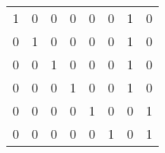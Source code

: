 
\begin{table}[h]
\centering
\begin{tabular}{cccccccc}
1 & 0 & 0 & 0 & 0 & 0 & 1 & 0\\
0 & 1 & 0 & 0 & 0 & 0 & 1 & 0\\
0 & 0 & 1 & 0 & 0 & 0 & 1 & 0\\
0 & 0 & 0 & 1 & 0 & 0 & 1 & 0\\
0 & 0 & 0 & 0 & 1 & 0 & 0 & 1\\
0 & 0 & 0 & 0 & 0 & 1 & 0 & 1\\
\end{tabular}
\end{table}
